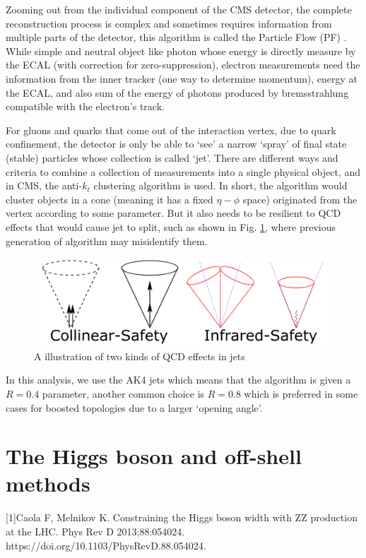 Zooming out from the individual component of the CMS detector, the complete reconstruction
process is complex and sometimes requires information from multiple parts of the detector, this
algorithm is called the Particle Flow (PF) \cite{particle_flow}. While simple and neutral object like photon whose 
energy is directly measure by the ECAL (with correction for zero-suppression), electron measurements
need the information from the inner tracker (one way to determine momentum), energy at the ECAL, and
also sum of the energy of photons produced by bremsstrahlung compatible with the electron's track.

For gluons and quarks that come out of the interaction vertex, due to quark confinement, the detector 
is only be able to `see' a narrow `spray' of final state (stable) particles whose collection is called `jet'.
There are different ways and criteria to combine a collection of measurements into a single physical object,
and in CMS, the anti-$k_t$ clustering algorithm is used. In short, the algorithm would cluster objects
in a cone (meaning it has a fixed $\eta-\phi$ space) originated from the vertex according to some parameter.
But it also needs to be resilient to QCD effects that would cause jet to split, such as shown in Fig.
\ref{fig:jet_split}, where previous generation of algorithm may misidentify them.

\begin{figure}[htb]
\begin{center}
\includegraphics[width=.85\linewidth]{fig/jet_split.png}
\end{center}
\caption{A illustration of two kinds of QCD effects in jets\protect\footnotemark}
\label{fig:jet_split}
\end{figure}

In this analysis, we use the AK4 jets which means that the algorithm is given a $R=0.4$ parameter, another
common choice is $R=0.8$ which is preferred in some cases for boosted topologies due to a larger `opening
angle'.

\section{The Higgs boson and off-shell methods}\label{sec:physics_offshell}
[1]Caola F, Melnikov K. Constraining the Higgs boson width with ZZ production at the LHC. Phys Rev D 2013;88:054024. https://doi.org/10.1103/PhysRevD.88.054024.

